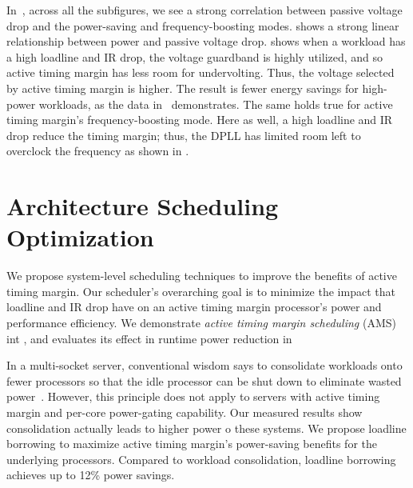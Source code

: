 In~, across all the subfigures, we see a strong correlation between passive voltage drop and the power-saving and frequency-boosting modes.  shows a strong linear relationship between power and passive voltage drop.  shows when a workload has a high loadline and IR drop, the voltage guardband is highly utilized, and so active timing margin has less room for undervolting. Thus, the voltage selected by active timing margin is higher. The result is fewer energy savings for high-power workloads, as the data in~ demonstrates. The same holds true for active timing margin's frequency-boosting mode. Here as well, a high loadline and IR drop reduce the timing margin; thus, the DPLL has limited room left to overclock the frequency as shown in .

\section{Architecture \/ Scheduling Optimization}
\label{sec:voltage:opt}

We propose system-level scheduling techniques to improve the benefits of active timing margin. Our scheduler's overarching goal is to minimize the impact that loadline and IR drop have on an active timing margin processor's power and performance efficiency. We demonstrate \emph{active timing margin scheduling} (AMS) int , and evaluates its effect in runtime power reduction in 

In a multi-socket server, conventional wisdom says to consolidate workloads onto fewer processors so that the idle processor can be shut down to eliminate wasted power~\cite{murthy2013linux,lo2014towards,leverich2014reconciling}. However, this principle does not apply to servers with active timing margin and per-core power-gating capability. Our measured results show consolidation actually leads to higher power o these systems. We propose loadline borrowing to maximize active timing margin's power-saving benefits for the underlying processors. Compared to workload consolidation, loadline borrowing achieves up to 12\% power savings.

